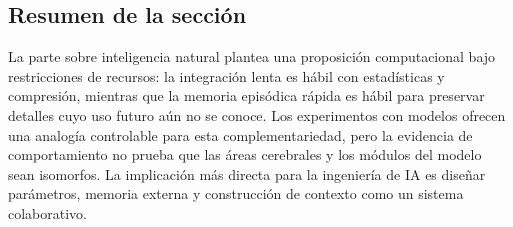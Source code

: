 

\subsection{Resumen de la sección}

La parte sobre inteligencia natural plantea una proposición computacional bajo restricciones de recursos: la integración lenta es hábil con estadísticas y compresión, mientras que la memoria episódica rápida es hábil para preservar detalles cuyo uso futuro aún no se conoce. Los experimentos con modelos ofrecen una analogía controlable para esta complementariedad, pero la evidencia de comportamiento no prueba que las áreas cerebrales y los módulos del modelo sean isomorfos. La implicación más directa para la ingeniería de IA es diseñar parámetros, memoria externa y construcción de contexto como un sistema colaborativo.
